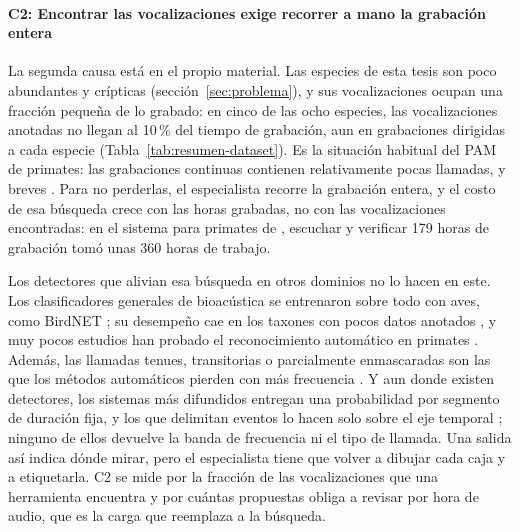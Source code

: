 \paragraph{C2: Encontrar las vocalizaciones exige recorrer a mano la grabación
    entera}
La segunda causa está en el propio material. Las especies de esta tesis son poco
abundantes y crípticas (sección~\ref{sec:problema}), y sus vocalizaciones ocupan
una fracción pequeña de lo grabado: en cinco de las ocho especies, las
vocalizaciones anotadas no llegan al 10\,\% del tiempo de grabación, aun en
grabaciones dirigidas a cada especie (Tabla~\ref{tab:resumen-dataset}). Es la situación habitual del PAM de primates:
las grabaciones continuas contienen relativamente pocas llamadas, y breves
\citep{heinicke_2015}. Para no perderlas, el especialista recorre la grabación entera, y el costo de esa búsqueda
crece con las horas grabadas, no con las vocalizaciones encontradas: en el sistema
para primates de \citet{heinicke_2015}, escuchar y verificar 179 horas de
grabación tomó unas 360 horas de trabajo.

Los detectores que alivian esa búsqueda en otros dominios no lo hacen en este. Los
clasificadores generales de bioacústica se entrenaron sobre todo con aves, como
BirdNET \citep{kahl_birdnet_2021}; su desempeño cae en los taxones con pocos datos
anotados \citep{dubus_deepforestsound_2026}, y muy pocos estudios han probado el
reconocimiento automático en primates \citep{perez-granados_passive_2021}. Además, las llamadas tenues, transitorias o
parcialmente enmascaradas son las que los métodos automáticos pierden con más
frecuencia \citep{gibb_2018}. Y aun donde existen detectores, los sistemas más difundidos entregan una probabilidad por
segmento de duración fija, y los que delimitan eventos lo hacen solo sobre el eje
temporal \citep{kahl_birdnet_2021,ebbers_sound_2024}; ninguno de ellos devuelve la banda de
frecuencia ni el tipo de llamada. Una salida así indica dónde mirar, pero el
especialista tiene que volver a dibujar cada caja y a etiquetarla. C2 se mide por
la fracción de las vocalizaciones que una herramienta encuentra y por cuántas
propuestas obliga a revisar por hora de audio, que es la carga que reemplaza a la
búsqueda.

